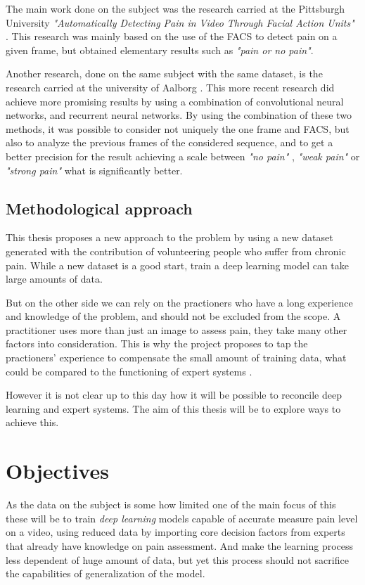 \documentclass[11pt]{article}
\begin{document}
The main work done on the subject was the research carried at the  Pittsburgh
University \emph{"Automatically Detecting Pain in Video Through Facial Action
Units"} \cite{lucey2011automatically}. This research was mainly based on the
use of the FACS to detect pain on a given frame, but obtained elementary
results such as \emph{"pain or no pain"}.

Another research, done on the same subject with the same dataset, is the
research carried at the university of Aalborg \cite{bellantonio2016spatio}.
This more recent research did achieve more promising results by using a
combination of convolutional neural networks, and recurrent neural networks.
By using the combination of these two methods, it was possible to consider
not uniquely the one frame and FACS, but also to analyze the previous frames
of the considered sequence, and to get a better precision for the result
achieving a scale between \emph{"no pain"} , \emph{"weak pain"} or \emph{"strong pain"} what
is significantly better.

\subsection{Methodological approach}
\label{sec:org15c6af8}
This thesis proposes a new approach to the problem by using a new dataset
generated with the contribution of volunteering people who suffer from
chronic pain. While a new dataset is a good start, train a deep learning
model can take large amounts of data.

But on the other side we can rely on the practioners who have a long experience and
knowledge of the problem, and should not be excluded from the scope.
A practitioner uses more than just an image to assess pain, they take many other
factors into consideration. This is why the project proposes to tap the
practioners' experience to compensate the small amount of training data, what
could be compared to the functioning of expert systems
\cite{giarratano1998expert}.

However it is not clear up to this day how it will be possible to reconcile deep
learning and expert systems. The aim of this thesis will be to explore ways
to achieve this.


\section{Objectives}
\label{sec:org509d72d}
As the data on the subject is some how limited one of the main focus of this
these will be to train \emph{deep learning} models capable of accurate measure pain
level on a video, using reduced data by importing core decision factors from
experts that already have knowledge on pain assessment.
And make the learning process less dependent of huge amount of data, but yet
this process should not sacrifice the capabilities of generalization of the
model.
\end{document}
